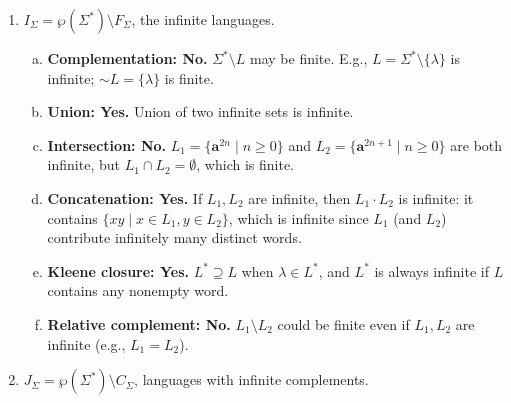 \begin{enumerate}[{5.}1. ]
\item $I_\Sigma=\wp(\Sigma^*)\setminus F_\Sigma$, the infinite languages.

\begin{enumerate}[(a)]
  \item \textbf{Complementation: No.}  $\Sigma^*\setminus L$ may be finite.  E.g., $L=\Sigma^*\setminus\{\lambda\}$ is infinite; $\sim L=\{\lambda\}$ is finite.
  \item \textbf{Union: Yes.}  Union of two infinite sets is infinite.
  \item \textbf{Intersection: No.}  $L_1=\{\pmb{a}^{2n}\mid n\ge 0\}$ and $L_2=\{\pmb{a}^{2n+1}\mid n\ge 0\}$ are both infinite, but $L_1\cap L_2=\emptyset$, which is finite.
  \item \textbf{Concatenation: Yes.}  If $L_1,L_2$ are infinite, then $L_1\cdot L_2$ is infinite: it contains $\{xy\mid x\in L_1, y\in L_2\}$, which is infinite since $L_1$ (and $L_2$) contribute infinitely many distinct words.
  \item \textbf{Kleene closure: Yes.}  $L^*\supseteq L$ when $\lambda\in L^*$, and $L^*$ is always infinite if $L$ contains any nonempty word.
  \item \textbf{Relative complement: No.}  $L_1\setminus L_2$ could be finite even if $L_1,L_2$ are infinite (e.g., $L_1=L_2$).
\end{enumerate}

\item $J_\Sigma=\wp(\Sigma^*)\setminus C_\Sigma$, languages with infinite complements.


\end{enumerate}
